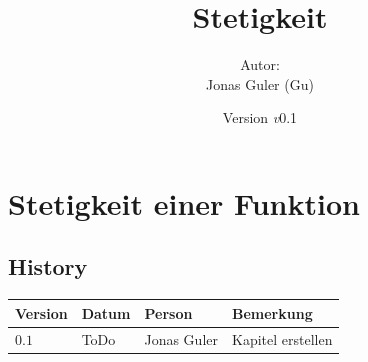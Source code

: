 \documentclass[11pt,oneside]{article}
\newcommand{\Skriptname}{Stetigkeit}
\newcommand{\Autor}{Jonas Guler (Gu)}
\newcommand{\version}{\textit{v}0.1}
\begin{document}
\begin{titlepage}
	\clearpage
	\title{\Huge\textbf{\Skriptname} \\[1cm]}
	\author{Autor:\\ \Autor}
	\date{\normalsize {Version \version}\\ \datelong}
	\maketitle
	\thispagestyle{empty}
	\vfill
	\tableofcontents
\end{titlepage}
\section{Stetigkeit einer Funktion}


\newpage
\subsection*{History}
\begin{table}[H]
	\centering
	\begin{tabular}{|p{13mm}|p{20mm}|p{30mm}|p{70mm}|}\hline
		Version & Datum & Person & Bemerkung \\\hline
		$0.1$ & ToDo & Jonas Guler & Kapitel erstellen \\\hline
	\end{tabular}
\end{table}
\end{document}

